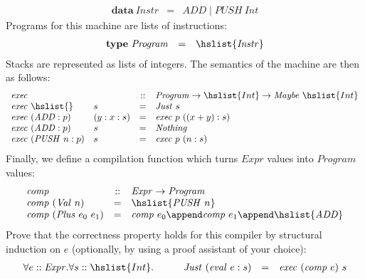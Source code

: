\documentclass[10pt,a4paper]{exam} %
\begin{document}
\begin{questions}
\begin{displaymath}
\begin{array}{lcl}
\mathbf{data}~\mathit{Instr} & = & \mathit{ADD} \mid \mathit{PUSH}~\mathit{Int}
\end{array}
\end{displaymath}
Programs for this machine are lists of instructions:
\begin{displaymath}
\begin{array}{lcl}
\mathbf{type}~\mathit{Program} & = & \hslist{\mathit{Instr}}
\end{array}
\end{displaymath}
Stacks are represented as lists of integers. The semantics of the machine are then as follows:
\begin{displaymath}
\begin{array}{llcl}
\mathit{exec} && :: & \mathit{Program} \to \hslist{Int} \to \mathit{Maybe}~\hslist{Int} \\
\mathit{exec}~\hslist{} & s & = & \mathit{Just}~s \\
\mathit{exec}~(\mathit{ADD} : p) & (y:x:s) & = &\mathit{exec}~p~((x+y):s) \\
\mathit{exec}~(\mathit{ADD} : p) & s & = & \mathit{Nothing} \\
\mathit{exec}~(\mathit{PUSH}~n:p) & s & = & \mathit{exec}~p~(n:s)
\end{array}
\end{displaymath}
Finally, we define a compilation function which turns $\mathit{Expr}$ values into $\mathit{Program}$ values:
\begin{displaymath}
\begin{array}{lcl}
\mathit{comp} & :: & \mathit{Expr} \to \mathit{Program} \\
\mathit{comp}~(\mathit{Val}~n) & = & \hslist{\mathit{PUSH}~n} \\
\mathit{comp}~(\mathit{Plus}~e_0~e_1) & = & \mathit{comp}~e_0 \append \mathit{comp}~e_1 \append \hslist{\mathit{ADD}}
\end{array}
\end{displaymath}
Prove that the correctness property holds for this compiler by structural induction on $e$ (optionally, by using a proof assistant of your choice):
\begin{displaymath}
\begin{array}{llcl}
\forall e :: \mathit{Expr}.\forall s :: \hslist{Int}. \qquad & \mathit{Just}~(\mathit{eval}~e : s) & = & \mathit{exec}~(\mathit{comp}~e)~s
\end{array}
\end{displaymath}


\end{questions}
\end{document}
